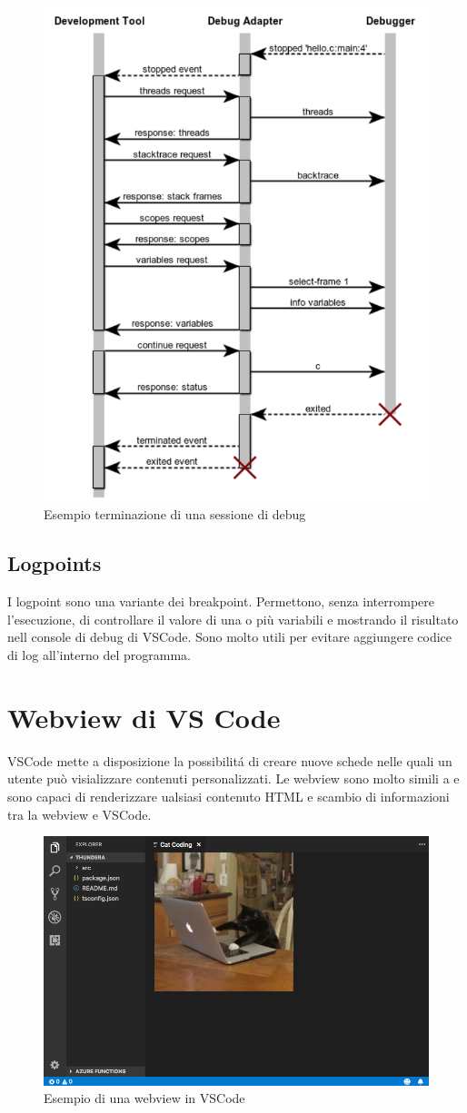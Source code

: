 \begin{figure}[H]    
    \centering
    \includegraphics[width=0.7\columnwidth]{images/stop-continue-terminate.png}
    \caption{Esempio terminazione di una sessione di debug\cite{DAP}}
\end{figure}

\subsection{Logpoints}
I logpoint sono una variante dei breakpoint. Permettono, senza interrompere l'esecuzione, di controllare il valore di una o più variabili e mostrando il risultato nell console di debug di VSCode. Sono molto utili per evitare aggiungere codice di log all'interno del programma.

\section{Webview di VS Code}

VSCode mette a disposizione la possibilitá di creare nuove schede nelle quali un utente può visializzare contenuti personalizzati. Le webview sono molto simili a  e sono capaci di renderizzare ualsiasi contenuto HTML e scambio di informazioni tra la webview e VSCode. 

\begin{figure}[H]
    \centering
    \includegraphics[width=0.7\columnwidth]{images/cat_coding.png}
    \caption{Esempio di una webview in VSCode}
    \label{fig:webcat}
\end{figure}
